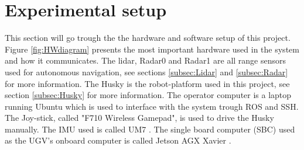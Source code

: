 \section{Experimental setup} %
This section will go trough the the hardware and software setup of this project. Figure \ref{fig:HWdiagram} presents the most important hardware used in the system and how it communicates. The lidar, Radar0 and Radar1 are all range sensors used for autonomous navigation, see sections \ref{subsec:Lidar} and \ref{subsec:Radar} for more information. The Husky is the robot-platform used in this project, see section \ref{subsec:Husky} for more information. The operator computer is a laptop running Ubuntu which is used to interface with the system trough ROS and SSH. The Joy-stick, called "F710 Wireless Gamepad"\cite{logitechF710}, is used to drive the Husky manually. The IMU used is called UM7 \cite{redshiftlabs-um7}. The single board computer (SBC) used as the UGV's onboard computer is called Jetson AGX Xavier \cite{jetson-agx-xavier-user-guide}.

